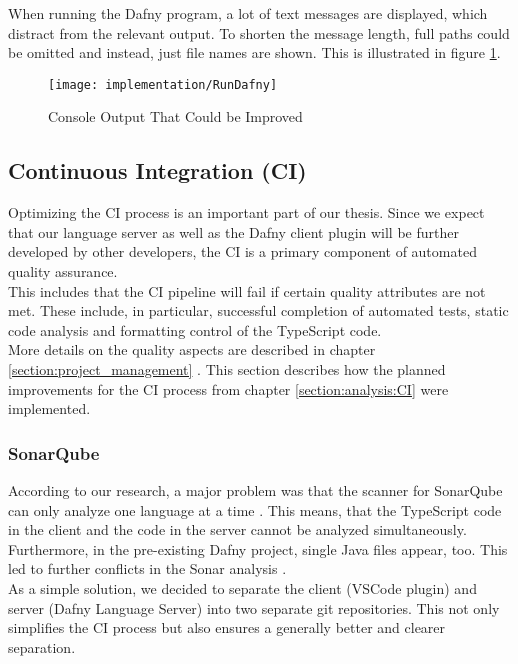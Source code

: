 {When running the Dafny program,
a lot of text messages are displayed,
which distract from the relevant output.
To shorten the message length, full paths could be omitted and instead, just file names are shown.
This is illustrated in figure \ref{fig:long_compile_output}.

\begin{figure}[H]
    \centering
    \texttt{[image: implementation/RunDafny]}
    \caption{Console Output That Could be Improved}
    \label{fig:long_compile_output}
\end{figure}

\subsection{Continuous Integration (CI)}
Optimizing the CI process is an important part of our thesis.
Since we expect that our language server as well as the Dafny client plugin will be further developed by other developers,
the CI is a primary component of automated quality assurance. \\

This includes that the CI pipeline will fail if certain quality attributes are not met.
These include, in particular, successful completion of automated tests,
static code analysis and formatting control of the TypeScript code. \\

More details on the quality aspects are described in chapter
\ref{section:project_management} \textendash{} .
This section describes how the planned improvements for the CI process from chapter \ref{section:analysis:CI} were implemented.

\subsubsection{SonarQube}
According to our research, a major problem was that the scanner for SonarQube can only analyze one language at a time \cite{sonar-supports-only-one-language}.
This means, that the TypeScript code in the client and the \CsharpWithSpace code in the server cannot be analyzed simultaneously.
Furthermore, in the pre-existing Dafny project, single Java files appear, too.
This led to further conflicts in the Sonar analysis \cite{sa}.\\

As a simple solution, we decided to separate the client (VSCode plugin) and server (Dafny Language Server) into two separate git repositories.
This not only simplifies the CI process but also ensures a generally better and clearer separation. \\

}
